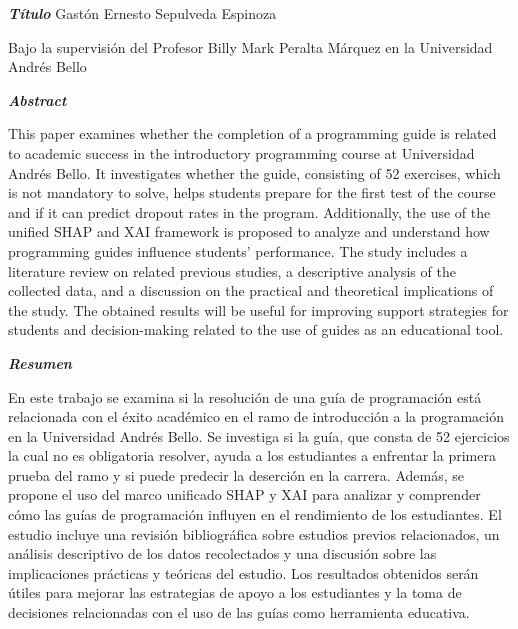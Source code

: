 \begin{center}
    \textbf{\LARGE \textit{Título}}
    \vfill
    Gastón Ernesto Sepulveda Espinoza

    Bajo la supervisión del Profesor Billy Mark Peralta Márquez en la Universidad Andrés Bello

\end{center}
\vfill

\begin{center}
    \textbf{\LARGE \textit{Abstract}}
\end{center}

This paper examines whether the completion of a programming guide is related to academic success in the introductory programming course at Universidad Andrés Bello. It investigates whether the guide, consisting of 52 exercises, which is not mandatory to solve, helps students prepare for the first test of the course and if it can predict dropout rates in the program.
Additionally, the use of the unified SHAP and XAI framework is proposed to analyze and understand how programming guides influence students' performance. The study includes a literature review on related previous studies, a descriptive analysis of the collected data, and a discussion on the practical and theoretical implications of the study.
The obtained results will be useful for improving support strategies for students and decision-making related to the use of guides as an educational tool.

\vfill

\begin{center}
    \textbf{\LARGE \textit{Resumen}}
\end{center}

En este trabajo se examina si la resolución de una guía de programación está relacionada con el éxito académico en el ramo de introducción a la programación en la Universidad Andrés Bello. Se investiga si la guía, que consta de 52 ejercicios la cual no es obligatoria resolver, ayuda a los estudiantes a enfrentar la primera prueba del ramo y si puede predecir la deserción en la carrera.
Además, se propone el uso del marco unificado SHAP y XAI para analizar y comprender cómo las guías de programación influyen en el rendimiento de los estudiantes. El estudio incluye una revisión bibliográfica sobre estudios previos relacionados, un análisis descriptivo de los datos recolectados y una discusión sobre las implicaciones prácticas y teóricas del estudio.
Los resultados obtenidos serán útiles para mejorar las estrategias de apoyo a los estudiantes y la toma de decisiones relacionadas con el uso de las guías como herramienta educativa.
\vfill
